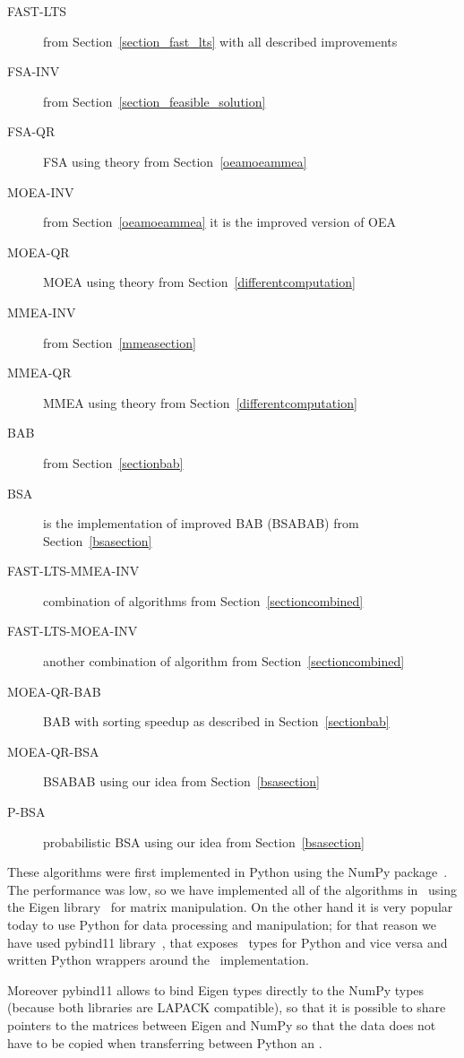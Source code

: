 \begin{description}
    \item[FAST-LTS] from Section~\ref{section_fast_lts} with all described improvements
    \item[FSA-INV] from Section~\ref{section_feasible_solution}
    \item[FSA-QR] FSA using theory from Section~\ref{oeamoeammea}
    \item[MOEA-INV] from Section~\ref{oeamoeammea} it is the improved version of OEA
    \item[MOEA-QR] MOEA using theory from Section~\ref{differentcomputation}
    \item[MMEA-INV] from Section~\ref{mmeasection}
    \item[MMEA-QR] MMEA using theory from Section~\ref{differentcomputation}
    \item[BAB] from Section~\ref{sectionbab}
    \item[BSA] is the implementation of improved BAB (BSABAB) from Section~\ref{bsasection}
    \item[FAST-LTS-MMEA-INV] combination of algorithms from Section~\ref{sectioncombined}
    \item[FAST-LTS-MOEA-INV] another combination of algorithm from Section~\ref{sectioncombined}
    \item[MOEA-QR-BAB] BAB with sorting speedup as described in Section~\ref{sectionbab}
    \item[MOEA-QR-BSA] BSABAB using our idea from Section~\ref{bsasection}
    \item[P-BSA] probabilistic BSA using our idea from Section~\ref{bsasection}
\end{description}

These algorithms were first implemented in Python using the NumPy package~\cite{numpy}. The performance was low, so we have implemented all of the algorithms in \CC \ using the Eigen library~\cite{eigenweb} for matrix manipulation. On the other hand it is very popular today to use Python for data processing and manipulation; for that reason we have used pybind11 library~\cite{pybind11}, that exposes \CC \ types for Python and vice versa and written Python wrappers around the \CC \ implementation. 

Moreover pybind11 allows to bind Eigen types directly to the NumPy types (because both libraries are LAPACK compatible), so that it is possible to share pointers to the matrices between Eigen and NumPy so that the data does not have to be copied when transferring between Python an \CC.

